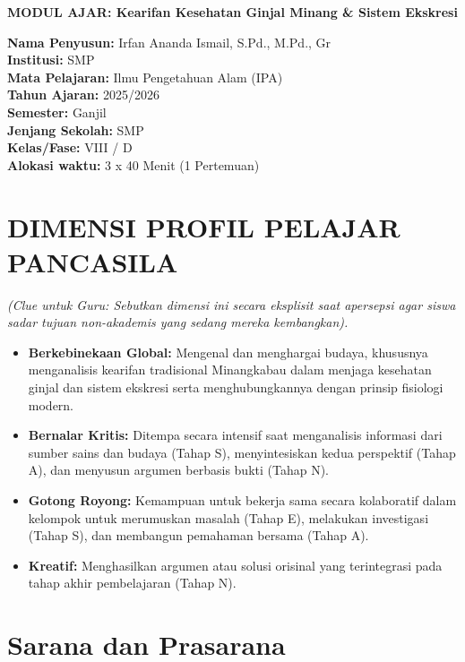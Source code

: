 \documentclass[a4paper,12pt]{article}
\begin{document}
\begin{center}
{\Large\textbf{MODUL AJAR: Kearifan Kesehatan Ginjal Minang \& Sistem Ekskresi}}
\end{center}

\vspace{0.5cm}

\begin{tcolorbox}[mainbox]
\textbf{Nama Penyusun:} Irfan Ananda Ismail, S.Pd., M.Pd., Gr \\
\textbf{Institusi:} SMP \\
\textbf{Mata Pelajaran:} Ilmu Pengetahuan Alam (IPA) \\
\textbf{Tahun Ajaran:} 2025/2026 \\
\textbf{Semester:} Ganjil \\
\textbf{Jenjang Sekolah:} SMP \\
\textbf{Kelas/Fase:} VIII / D \\
\textbf{Alokasi waktu:} 3 x 40 Menit (1 Pertemuan)
\end{tcolorbox}

\section{DIMENSI PROFIL PELAJAR PANCASILA}
\textit{(Clue untuk Guru: Sebutkan dimensi ini secara eksplisit saat apersepsi agar siswa sadar tujuan non-akademis yang sedang mereka kembangkan).}

\begin{itemize}
\item \textbf{Berkebinekaan Global:} Mengenal dan menghargai budaya, khususnya menganalisis kearifan tradisional Minangkabau dalam menjaga kesehatan ginjal dan sistem ekskresi serta menghubungkannya dengan prinsip fisiologi modern.
\item \textbf{Bernalar Kritis:} Ditempa secara intensif saat menganalisis informasi dari sumber sains dan budaya (Tahap S), menyintesiskan kedua perspektif (Tahap A), dan menyusun argumen berbasis bukti (Tahap N).
\item \textbf{Gotong Royong:} Kemampuan untuk bekerja sama secara kolaboratif dalam kelompok untuk merumuskan masalah (Tahap E), melakukan investigasi (Tahap S), dan membangun pemahaman bersama (Tahap A).
\item \textbf{Kreatif:} Menghasilkan argumen atau solusi orisinal yang terintegrasi pada tahap akhir pembelajaran (Tahap N).
\end{itemize}

\section{Sarana dan Prasarana}
\end{document}
